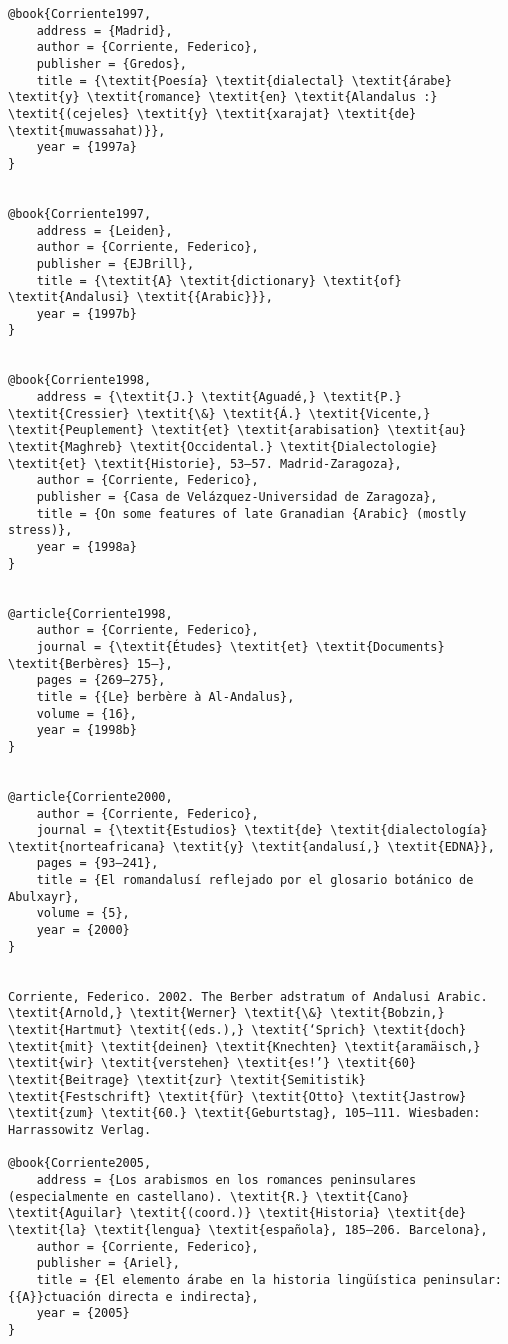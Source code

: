 \documentclass[output=paper,modfonts,nonflat]{langsci/langscibook}
\begin{document}
\begin{verbatim}
@book{Corriente1997,
	address = {Madrid},
	author = {Corriente, Federico},
	publisher = {Gredos},
	title = {\textit{Poesía} \textit{dialectal} \textit{árabe} \textit{y} \textit{romance} \textit{en} \textit{Alandalus :} \textit{(cejeles} \textit{y} \textit{xarajat} \textit{de} \textit{muwassahat)}},
	year = {1997a}
}


@book{Corriente1997,
	address = {Leiden},
	author = {Corriente, Federico},
	publisher = {EJBrill},
	title = {\textit{A} \textit{dictionary} \textit{of} \textit{Andalusi} \textit{{Arabic}}},
	year = {1997b}
}


@book{Corriente1998,
	address = {\textit{J.} \textit{Aguadé,} \textit{P.} \textit{Cressier} \textit{\&} \textit{Á.} \textit{Vicente,} \textit{Peuplement} \textit{et} \textit{arabisation} \textit{au} \textit{Maghreb} \textit{Occidental.} \textit{Dialectologie} \textit{et} \textit{Historie}, 53–57. Madrid-Zaragoza},
	author = {Corriente, Federico},
	publisher = {Casa de Velázquez-Universidad de Zaragoza},
	title = {On some features of late Granadian {Arabic} (mostly stress)},
	year = {1998a}
}


@article{Corriente1998,
	author = {Corriente, Federico},
	journal = {\textit{Études} \textit{et} \textit{Documents} \textit{Berbères} 15–},
	pages = {269–275},
	title = {{Le} berbère à Al-Andalus},
	volume = {16},
	year = {1998b}
}


@article{Corriente2000,
	author = {Corriente, Federico},
	journal = {\textit{Estudios} \textit{de} \textit{dialectología} \textit{norteafricana} \textit{y} \textit{andalusí,} \textit{EDNA}},
	pages = {93–241},
	title = {El romandalusí reflejado por el glosario botánico de Abulxayr},
	volume = {5},
	year = {2000}
}


Corriente, Federico. 2002. The Berber adstratum of Andalusi Arabic. \textit{Arnold,} \textit{Werner} \textit{\&} \textit{Bobzin,} \textit{Hartmut} \textit{(eds.),} \textit{‘Sprich} \textit{doch} \textit{mit} \textit{deinen} \textit{Knechten} \textit{aramäisch,} \textit{wir} \textit{verstehen} \textit{es!’} \textit{60} \textit{Beitrage} \textit{zur} \textit{Semitistik} \textit{Festschrift} \textit{für} \textit{Otto} \textit{Jastrow} \textit{zum} \textit{60.} \textit{Geburtstag}, 105–111. Wiesbaden: Harrassowitz Verlag.

@book{Corriente2005,
	address = {Los arabismos en los romances peninsulares (especialmente en castellano). \textit{R.} \textit{Cano} \textit{Aguilar} \textit{(coord.)} \textit{Historia} \textit{de} \textit{la} \textit{lengua} \textit{española}, 185–206. Barcelona},
	author = {Corriente, Federico},
	publisher = {Ariel},
	title = {El elemento árabe en la historia lingüística peninsular: {{A}}ctuación directa e indirecta},
	year = {2005}
}



\end{verbatim}
\end{document}

